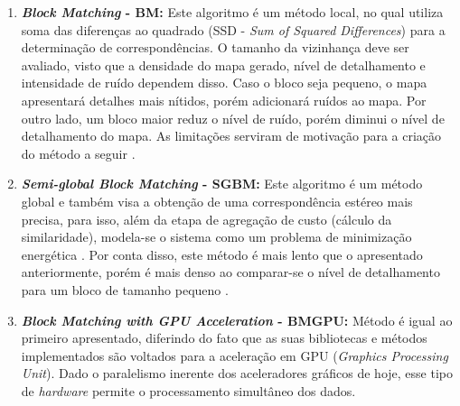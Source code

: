 \begin{enumerate}
 \item \textbf{\textit{Block Matching} - BM:} Este algoritmo é um método local, no qual utiliza soma das diferenças ao quadrado (SSD - \textit{Sum of Squared Differences}) para a determinação de correspondências. O tamanho da vizinhança deve ser avaliado, visto que a densidade do mapa gerado, nível de detalhamento e intensidade de ruído dependem disso. Caso o bloco seja pequeno, o mapa apresentará detalhes mais nítidos, porém adicionará ruídos ao mapa. Por outro lado, um bloco maior reduz o nível de ruído, porém diminui o nível de detalhamento do mapa. As limitações serviram de motivação para a criação do método a seguir \cite{Hirschmuller2008}.   
 \item \textbf{\textit{Semi-global Block Matching} - SGBM:} Este algoritmo é um método global e também visa a obtenção de uma correspondência estéreo mais precisa, para isso, além da etapa de agregação de custo (cálculo da similaridade), modela-se o sistema como um problema de minimização energética \cite{JunhwanKim2003}. Por conta disso, este método é mais lento que o apresentado anteriormente, porém é mais denso ao comparar-se o nível de detalhamento para um bloco de tamanho pequeno \cite{Hirschmuller2008}.
 \item \textbf{\textit{Block Matching with GPU Acceleration} - BMGPU:} Método é igual ao primeiro apresentado, diferindo do fato que as suas bibliotecas e métodos implementados são voltados para a aceleração em GPU (\textit{Graphics Processing Unit}). Dado o paralelismo inerente dos aceleradores gráficos de hoje, esse tipo de \textit{hardware} permite o processamento simultâneo dos dados. 
\end{enumerate}






